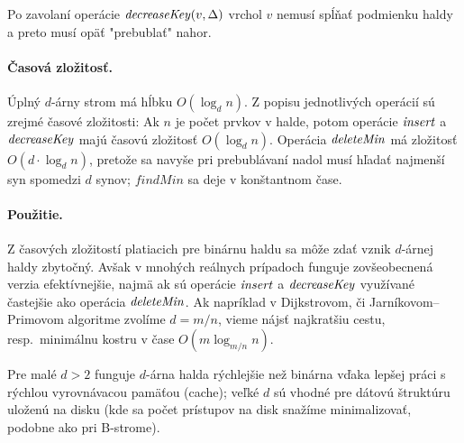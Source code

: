 Po zavolaní operácie $\mathop{\mathit{decreaseKey}}(v, \Delta)$ vrchol $v$ nemusí spĺňať podmienku haldy a preto musí opäť 
"prebublať" nahor.

\paragraph{Časová zložitosť.}
Úplný $d$-árny strom má hĺbku $O(\log_d n)$. Z popisu jednotlivých operácií sú zrejmé časové zložitosti:
Ak $n$ je počet prvkov v halde, potom operácie $\mathop{\mathit{insert}}$ a $\mathop{\mathit{decreaseKey}}$ majú časovú zložitosť $O(\log_d n)$.
Operácia $\mathop{\mathit{deleteMin}}$ má zložitosť $O(d\cdot \log_d n)$, pretože sa navyše pri prebublávaní nadol musí
hľadať najmenší syn spomedzi $d$ synov; $\mathit{findMin}$ sa deje v konštantnom čase.

\paragraph{Použitie.}
Z časových zložitostí platiacich pre binárnu haldu sa môže zdať vznik $d$-árnej haldy zbytočný. Avšak v mnohých 
reálnych prípadoch funguje zovšeobecnená verzia efektívnejšie, najmä ak sú operácie $\mathop{\mathit{insert}}$ a $\mathop{\mathit{decreaseKey}}$
využívané častejšie ako operácia $\mathop{\mathit{deleteMin}}$. Ak napríklad v Dijkstrovom, či Jarníkovom--Primovom
algoritme zvolíme $d=m/n$, vieme nájsť najkratšiu cestu, resp.\ minimálnu kostru v čase $O(m\log_{m/n} n)$.

Pre malé $d>2$ funguje $d$-árna halda rýchlejšie než binárna vďaka lepšej práci s rýchlou vyrovnávacou pamäťou
(cache); veľké $d$ sú vhodné pre dátovú štruktúru uloženú na disku (kde sa počet prístupov na disk snažíme minimalizovať,
podobne ako pri B-strome).

